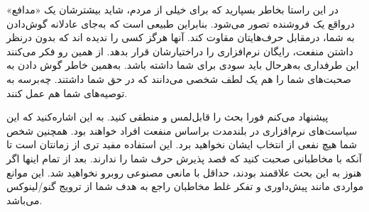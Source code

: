 در این راستا بخاطر بسپارید که برای خیلی از مردم، شاید بیشترشان
یک «مدافع» درواقع یک فروشنده تصور می‌شود. بنابراین طبیعی است
که به‌جای عادلانه گوش‌دادن به شما، درمقابل حرف‌هایتان مقاوت کند.
آنها هرگز کسی را ندیده اند که بدون درنظر داشتن منفعت، رایگان
نرم‌افزاری را دراختیارشان قرار بدهد. از همین رو فکر می‌کنند این طرفداری
به‌هرحال باید سودی برای شما داشته باشد. به‌همین خاطر گوش دادن به صحبت‌های
شما را هم یک لطف شخصی می‌دانند که در حق شما داشتند. چه‌برسه به توصیه‌های
شما هم عمل کنند.

پیشنهاد می‌کنم فورا بحث را قابل‌لمس و منطقی کنید. به این اشاره‌کنید
که این سیاست‌های نرم‌افزاری در بلندمدت براساس منفعت افراد خواهند بود.
همچنین شخص شما هیچ نفعی از انتخاب ایشان نخواهید برد. این استفاده
مفید تری از زمانتان است تا آنکه با مخاطبانی صحبت کنید که قصد پذیرش
حرف شما را ندارند. بعد از تمام اینها اگر هنوز به این بحث علاقمند بودند،
حداقل با مانعی مصنوعی روبرو نخواهید شد. این موانع مواردی مانند پیش‌داوری
و تفکر غلط مخاطبان راجع به هدف شما از ترویج گنو/لینوکس می‌باشد.

